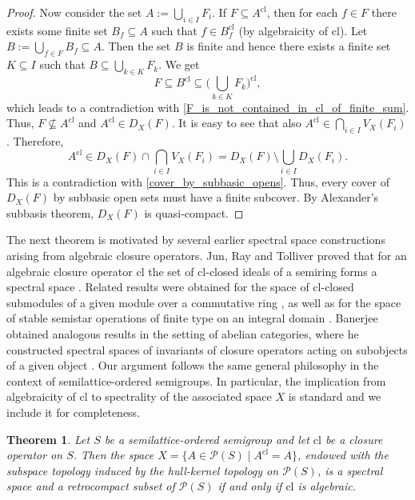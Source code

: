\documentclass[10pt,a4paper]{amsart}
\newtheorem{theorem}{Theorem}[section]
\begin{document}
\begin{proof}
    Now consider the set $A := \bigcup_{i \in I} F_i$. If $F \subseteq A^\mathrm{cl}$, then for each $f \in F$ there exists some finite set $B_f \subseteq A$ such that $f \in B_f^\mathrm{cl}$ (by algebraicity of $\mathrm{cl}$). Let $B := \bigcup_{f\in F}B_f \subseteq A$. Then the set $B$ is finite and hence there exists a finite set $K \subseteq I$ such that $B \subseteq \bigcup_{k \in K} F_k$. We get $$F \subseteq B^\mathrm{cl} \subseteq \Big(\bigcup_{k \in K} F_k\Big)^\mathrm{cl},$$ 
    which leads to a contradiction with \eqref{F_is_not_contained_in_cl_of_finite_sum}. Thus, $F \nsubseteq A^\mathrm{cl}$ and $A^\mathrm{cl} \in D_X(F)$. It is easy to see that also $A^\mathrm{cl} \in \bigcap_{i \in I} V_X(F_i)$. Therefore, 
    \begin{equation*}
        A^\mathrm{cl} \in D_X(F) \cap \bigcap_{i \in I} V_X(F_i) = D_X(F) \setminus \bigcup_{i \in I} D_X(F_i). 
    \end{equation*}
    This is a contradiction with \eqref{cover_by_subbasic_opens}. Thus, every cover of $D_X(F)$ by subbasic open sets must have a finite subcover. By Alexander's subbasis theorem, $D_X(F)$ is quasi-compact. 
\end{proof}
The next theorem is motivated by several earlier spectral space constructions arising from algebraic closure operators. Jun, Ray and Tolliver proved that for an algebraic closure operator $\mathrm{cl}$ the set of $\mathrm{cl}$-closed ideals of a semiring forms a spectral space \cite[Proposition~3.9]{JunRayTolliver}. Related results were obtained for the space of $\mathrm{cl}$-closed submodules of a given module over a commutative ring \cite[Proposition 3.4]{FinocchiaroFontanaSpiritoNullstellensatz}, as well as for the space of stable semistar operations of finite type on an integral domain \cite[Theorem 4.6]{FinocchiaroFontanaSpirito}. Banerjee obtained analogous results in the setting of abelian categories, where he constructed spectral spaces of invariants of closure operators acting on subobjects of a given object \cite[Proposition 3.3]{Banerjee}. Our argument follows the same general philosophy in the context of semilattice-ordered semigroups. In particular, the implication from algebraicity of $\mathrm{cl}$ to spectrality of the associated space $X$ is standard and we include it for completeness. 


\begin{theorem}\label{construction_of_spectral_space}
    Let $S$ be a semilattice-ordered semigroup and let $\mathrm{cl}$ be a closure operator on $S$. Then the space $X = \{A \in\mathcal{P}(S) \mid A^\mathrm{cl} = A\}$,
    endowed with the subspace topology induced by the hull-kernel topology on $\mathcal{P}(S)$, is a spectral space and a retrocompact subset of $\mathcal{P}(S)$ if and only if $\mathrm{cl}$ is algebraic.
\end{theorem}
\end{document}
